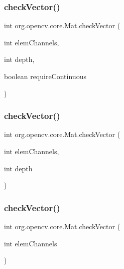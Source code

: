 \subsubsection{\texorpdfstring{check\+Vector()}{checkVector()}\hspace{0.1cm}{\footnotesize\ttfamily [1/3]}}
{\footnotesize\ttfamily int org.\+opencv.\+core.\+Mat.\+check\+Vector (\begin{DoxyParamCaption}\item[{int}]{elem\+Channels,  }\item[{int}]{depth,  }\item[{boolean}]{require\+Continuous }\end{DoxyParamCaption})}

\mbox{\label{classorg_1_1opencv_1_1core_1_1_mat_ae1237684f5ce865f9f74f2de48f73c60}} 
\subsubsection{\texorpdfstring{check\+Vector()}{checkVector()}\hspace{0.1cm}{\footnotesize\ttfamily [2/3]}}
{\footnotesize\ttfamily int org.\+opencv.\+core.\+Mat.\+check\+Vector (\begin{DoxyParamCaption}\item[{int}]{elem\+Channels,  }\item[{int}]{depth }\end{DoxyParamCaption})}

\mbox{\label{classorg_1_1opencv_1_1core_1_1_mat_a336960f25d39af05618890ee00b7e28e}} 
\subsubsection{\texorpdfstring{check\+Vector()}{checkVector()}\hspace{0.1cm}{\footnotesize\ttfamily [3/3]}}
{\footnotesize\ttfamily int org.\+opencv.\+core.\+Mat.\+check\+Vector (\begin{DoxyParamCaption}\item[{int}]{elem\+Channels }\end{DoxyParamCaption})}


